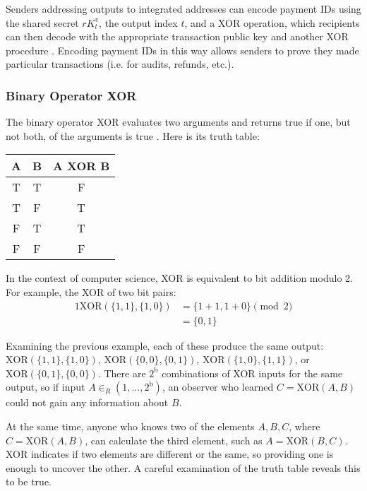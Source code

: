 Senders addressing outputs to integrated addresses can encode payment IDs using the shared secret $r K_t^v$, the output index $t$, and a XOR operation, which recipients can then decode with the appropriate transaction public key and another XOR procedure \cite{integrated-addresses}. Encoding payment IDs in this way allows senders to prove they made particular transactions (i.e. for audits, refunds, etc.).
    
\subsubsection*{Binary Operator XOR}

The binary operator XOR evaluates two arguments and returns true if one, but not both, of the arguments is true \cite{wolfram-xor}. Here is its truth table:

\begin{center}
    \begin{tabular}{|c|c|c|}
    \hline
        A & B & A XOR B \\
    \hline\hline
        T & T & F \\
    \hline
        T & F & T \\
    \hline
        F & T & T \\
    \hline
        F & F & F \\
    \hline
    \end{tabular}
\end{center}

In the context of computer science, XOR is equivalent to bit addition modulo 2. For example, the XOR of two bit pairs:
\begin{alignat*}{1}
    \text{XOR}(\{1,1\},\{1,0\}) &= \{1+1,1+0\} \pmod 2 \\
                                &= \{0,1\} 
\end{alignat*}

Examining the previous example, each of these produce the same output: $\text{XOR}(\{1,1\},\{1,0\})$, $\text{XOR}(\{0,0\},\{0,1\})$, $\text{XOR}(\{1,0\},\{1,1\})$, or $\text{XOR}(\{0,1\},\{0,0\})$. There are $2^{\text{b}}$ combinations of XOR inputs for the same output, so if input $A \in_R (1,...,2^{\text{b}})$, an observer who learned $C = \text{XOR}(A,B)$ could not gain any information about $B$.

At the same time, anyone who knows two of the elements $A,B,C$, where $C = \text{XOR}(A,B)$, can calculate the third element, such as $A = \text{XOR}(B,C)$. XOR indicates if two elements are different or the same, so providing one is enough to uncover the other. A careful examination of the truth table reveals this to be true.
    
